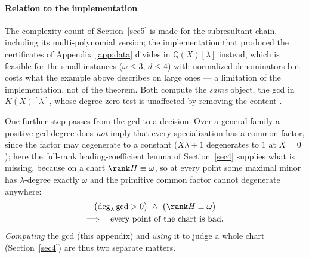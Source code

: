 \paragraph{Relation to the implementation}\label{appBC:sub:impl}
The complexity count of Section~\ref{sec5} is made for the subresultant chain, including its
multi-polynomial version; the implementation that produced the certificates of
Appendix~\ref{app:data} divides in $\mathbb{Q}(X)[\lambda]$ instead, which is feasible for the small
instances ($\omega\le3$, $d\le4$) with normalized denominators but costs what the example above
describes on large ones --- a limitation of the implementation, not of the theorem. Both compute the
\emph{same} object, the gcd in $K(X)[\lambda]$, whose degree-zero test is unaffected by removing the
content \cite{vzgg03}.

One further step passes from the gcd to a decision. Over a general family a positive gcd degree does
\emph{not} imply that every specialization has a common factor, since the factor may degenerate to a
constant ($X\lambda+1$ degenerates to $1$ at $X=0$); here the full-rank leading-coefficient lemma of
Section~\ref{sec4} supplies what is missing, because on a chart $\rank H\equiv\omega$, so at every
point some maximal minor has $\lambda$-degree exactly $\omega$ and the primitive common factor cannot
degenerate anywhere:
\[
\begin{gathered}
\bigl(\deg_\lambda\gcd>0\bigr)\ \wedge\ \bigl(\rank H\equiv\omega\bigr)\\
\Longrightarrow\quad \text{every point of the chart is bad}.
\end{gathered}
\]
\emph{Computing} the gcd (this appendix) and \emph{using} it to judge a whole chart
(Section~\ref{sec4}) are thus two separate matters.


